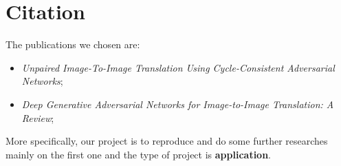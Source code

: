 \section{Citation}

The publications we chosen are:
\begin{itemize}
    \item \textit{Unpaired Image-To-Image Translation Using Cycle-Consistent Adversarial Networks}\cite{zhu_unpaired_2017};
    \item \textit{Deep Generative Adversarial Networks for Image-to-Image Translation: A Review}\cite{sym12101705};
\end{itemize}

More specifically, our project is to reproduce and
do some further researches mainly on the first one
and the type of project is \textbf{application}.
